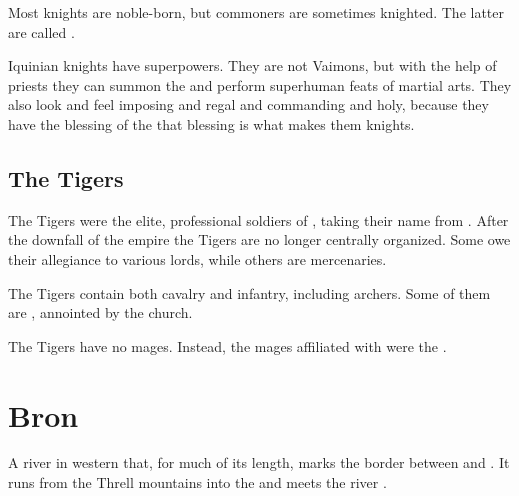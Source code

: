 Most knights are noble-born, but commoners are sometimes knighted. The latter are called . 

Iquinian knights have superpowers.
They are not Vaimons, but with the help of priests they can summon the \sephiroth and perform superhuman feats of martial arts.
They also look and feel imposing and regal and commanding and holy, because they have the blessing of the \sephiroth\dash{}that blessing is what makes them knights.









\subsection{The Tigers}
The Tigers were the elite, professional soldiers of , taking their name from . 
After the downfall of the empire the Tigers are no longer centrally organized. 
Some owe their allegiance to various lords, while others are mercenaries. 

The Tigers contain both cavalry and infantry, including archers. 
Some of them are , annointed by the  church. 

The Tigers have no mages. 
Instead, the mages affiliated with  were the . 















\section{Bron}
A river in western  that, for much of its length, marks the border between  and . It runs from the Threll mountains into the  and meets the river . 















